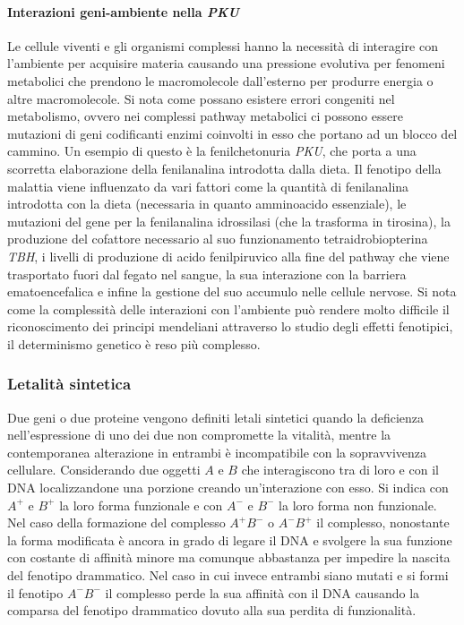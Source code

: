 \paragraph{Interazioni geni-ambiente nella \emph{PKU}}
Le cellule viventi e gli organismi complessi hanno la necessit\`a di interagire con l'ambiente per acquisire materia causando una pressione evolutiva per fenomeni metabolici che
prendono le macromolecole dall'esterno per produrre energia o altre macromolecole. Si nota come possano esistere errori congeniti nel metabolismo, ovvero nei complessi pathway 
metabolici ci possono essere mutazioni di geni codificanti enzimi coinvolti in esso che portano ad un blocco del cammino. Un esempio di questo \`e la fenilchetonuria \emph{PKU}, 
che porta a una scorretta elaborazione della fenilanalina introdotta dalla dieta. Il fenotipo della malattia viene influenzato da vari fattori come la quantit\`a di fenilanalina
introdotta con la dieta (necessaria in quanto amminoacido essenziale), le mutazioni del gene per la fenilanalina idrossilasi (che la trasforma in tirosina), la produzione del cofattore 
necessario al suo funzionamento tetraidrobiopterina \emph{TBH}, i livelli di produzione di acido fenilpiruvico alla fine del pathway che viene trasportato fuori dal fegato nel sangue, 
la sua interazione con la barriera ematoencefalica e infine la gestione del suo accumulo nelle cellule nervose. Si nota come la complessit\`a delle interazioni con l'ambiente pu\`o 
rendere molto difficile il riconoscimento dei principi mendeliani attraverso lo studio degli effetti fenotipici, il determinismo genetico \`e reso pi\`u complesso. 
\subsubsection{Letalit\`a sintetica}
Due geni o due proteine vengono definiti letali sintetici quando la deficienza nell'espressione di uno dei due non compromette la vitalit\`a, mentre la contemporanea alterazione in 
entrambi \`e incompatibile con la sopravvivenza cellulare. Considerando due oggetti $A$ e $B$ che interagiscono tra di loro e con il DNA localizzandone una porzione creando 
un'interazione con esso. Si indica con $A^+$ e $B^+$ la loro forma funzionale e con $A^-$ e $B^-$ la loro forma non funzionale. Nel caso della formazione del 
complesso $A^+B^-$ o $A^-B^+$ il complesso, nonostante la forma modificata \`e ancora in grado di legare il DNA e svolgere la sua funzione con costante di affinit\`a minore ma comunque
abbastanza per impedire la nascita del fenotipo drammatico. Nel caso in cui invece entrambi siano mutati e si formi il fenotipo $A^-B^-$ il complesso perde la sua affinit\`a con il 
DNA causando la comparsa del fenotipo drammatico dovuto alla sua perdita di funzionalit\`a. 
